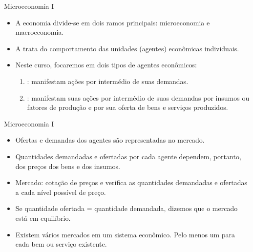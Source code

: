 \documentclass[10pt]{beamer}
\begin{document}
\begin{frame}{Microeconomia I}
    \begin{itemize}
        \item A economia divide-se em dois ramos principais: microeconomia e macroeconomia. \bigskip

        \item A  trata do comportamento das unidades (agentes) econômicas individuais. \bigskip

        \item Neste curso, focaremos em dois tipos de agentes econômicos: \medskip
        \begin{enumerate}
            \item {}: manifestam ações por intermédio de suas demandas.\medskip
            \item {}: manifestam suas ações por intermédio de suas demandas por insumos ou fatores de produção e por sua oferta de bens e serviços produzidos.
        \end{enumerate}
    \end{itemize}
\end{frame}

\begin{frame}
    {Microeconomia I}
    \begin{itemize}
        \item Ofertas e demandas dos agentes são representadas no mercado. \bigskip
        \item Quantidades demandadas e ofertadas por cada agente dependem, portanto, dos preços dos bens e dos insumos.\bigskip
        \item Mercado: cotação de preços e verifica as quantidades demandadas e ofertadas a cada nível possível de preço.\bigskip
        \item Se quantidade ofertada = quantidade demandada, dizemos que o mercado está em equilíbrio.\bigskip
        \item Existem vários mercados em um sistema econômico. Pelo menos um para cada bem ou serviço existente.
    \end{itemize}
\end{frame}
\end{document}
